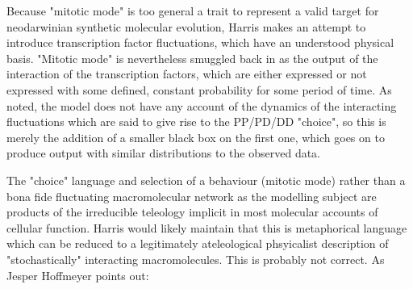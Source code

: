 \documentclass{ut-thesis}
\begin{document}
Because "mitotic mode" is too general a trait to represent a valid target for neodarwinian synthetic molecular evolution, Harris makes an attempt to introduce transcription factor fluctuations, which have an understood physical basis. "Mitotic mode" is nevertheless smuggled back in as the output of the interaction of the transcription factors, which are either expressed or not expressed with some defined, constant probability for some period of time. As noted, the model does not have any account of the dynamics of the interacting fluctuations which are said to give rise to the PP/PD/DD "choice", so this is merely the addition of a smaller black box on the first one, which goes on to produce output with similar distributions to the observed data.

The "choice" language and selection of a behaviour (mitotic mode) rather than a bona fide fluctuating macromolecular network as the modelling subject are products of the irreducible teleology implicit in most molecular accounts of cellular function. Harris would likely maintain that this is metaphorical language which can be reduced to a legitimately ateleological phsyicalist description of "stochastically" interacting macromolecules. This is probably not correct. As Jesper Hoffmeyer points out:

\bigskip
\end{document}
